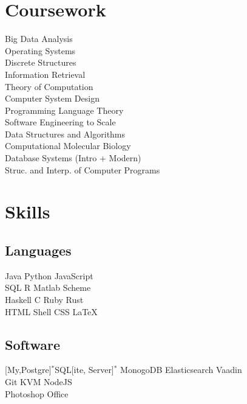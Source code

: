 \documentclass[]{deedy-resume}
\begin{document}
\begin{minipage}[t]{0.33\textwidth}
\sectionsep


\section{Coursework}
Big Data Analysis\\
Operating Systems\\
Discrete Structures\\
Information Retrieval\\
Theory of Computation\\
Computer System Design\\
Programming Language Theory\\
Software Engineering to Scale\\
Data Structures and Algorithms\\
Computational Molecular Biology\\
Database Systems (Intro + Modern)\\
Struc. and Interp. of Computer Programs\\
\sectionsep


\section{Skills}
\subsection{Languages}
Java \textbullet{}  
Python \textbullet{}
JavaScript \\
SQL \textbullet{}
R \textbullet{}
Matlab \textbullet{}
Scheme \\
Haskell \textbullet{}
C \textbullet{}
Ruby \textbullet{}
Rust \\
HTML \textbullet{}
Shell \textbullet{} 
CSS \textbullet{}
\LaTeX\ \\ 

\subsection{Software}
[My,Postgre]$^*$SQL[ite, Server]$^*$
MonogoDB \textbullet{}
Elasticsearch \textbullet{}
Vaadin \\
Git \textbullet{}
KVM \textbullet{}
NodeJS \\
Photoshop \textbullet{}
Office \\


\end{minipage}
\end{document}
